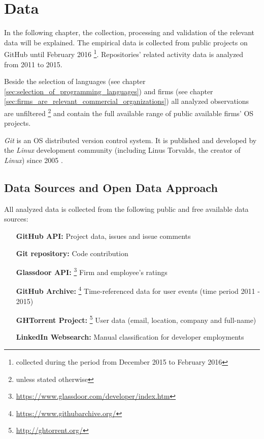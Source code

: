 \section{Data}
\label{sec:data}

In the following chapter, the collection, processing and validation of the relevant data will be explained. The empirical data is collected from public projects on GitHub until February 2016 \footnote{collected during the period from December 2015 to February 2016}. Repositories' related activity data is analyzed from 2011 to 2015.

Beside the selection of languages (see chapter \ref{sec:selection_of_programming_languages}) and firms (see chapter \ref{sec:firms_are_relevant_commercial_organizations}) all analyzed observations are unfiltered \footnote{unless stated otherwise} and contain the full available range of public available firms' OS projects.

\textit{Git} is an OS distributed version control system. It is published and developed by the \textit{Linux} development community (including Linus Torvalds, the creator of \textit{Linux}) since 2005 \cite[p.31]{chacon2014pro}.

\subsection{Data Sources and Open Data Approach}

All analyzed data is collected from the following public and free available data sources:

\begin{itemize}
	\item [\textbf{GitHub API:}] Project data, issues and issue comments
	\item [\textbf{Git repository:}] Code contribution
	\item [\textbf{Glassdoor API:}] \footnote{\url{https://www.glassdoor.com/developer/index.htm}} Firm and employee's ratings
	\item [\textbf{GitHub Archive:}] \footnote{\url{https://www.githubarchive.org/}} Time-referenced data for user events (time period 2011 - 2015)
	\item [\textbf{GHTorrent Project:}] \footnote{\url{http://ghtorrent.org/}} User data (email, location, company and full-name)
	\item [\textbf{LinkedIn Websearch:}] Manual classification for developer employments
\end{itemize}

